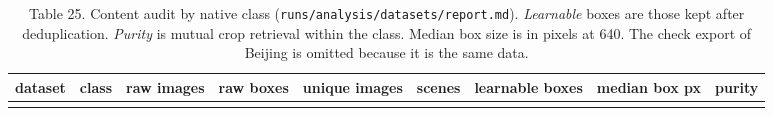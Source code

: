 \documentclass[
  10pt,
]{article}
\begin{document}
\begin{longtable}[]{@{}
  >{\raggedright\arraybackslash}p{}
  >{\raggedright\arraybackslash}p{}
  >{\raggedright\arraybackslash}p{}
  >{\raggedright\arraybackslash}p{}
  >{\raggedright\arraybackslash}p{}
  >{\raggedright\arraybackslash}p{}
  >{\raggedright\arraybackslash}p{}
  >{\raggedright\arraybackslash}p{}
  >{\raggedright\arraybackslash}p{}@{}}
\caption{Table 25. Content audit by native class
(\texttt{runs/analysis/datasets/report.md}). \emph{Learnable} boxes are
those kept after deduplication. \emph{Purity} is mutual crop retrieval
within the class. Median box size is in pixels at 640. The check export
of Beijing is omitted because it is the same data.}\tabularnewline
\toprule\noalign{}
\begin{minipage}[b]{\linewidth}\raggedright
dataset
\end{minipage} & \begin{minipage}[b]{\linewidth}\raggedright
class
\end{minipage} & \begin{minipage}[b]{\linewidth}\raggedright
raw images
\end{minipage} & \begin{minipage}[b]{\linewidth}\raggedright
raw boxes
\end{minipage} & \begin{minipage}[b]{\linewidth}\raggedright
unique images
\end{minipage} & \begin{minipage}[b]{\linewidth}\raggedright
scenes
\end{minipage} & \begin{minipage}[b]{\linewidth}\raggedright
learnable boxes
\end{minipage} & \begin{minipage}[b]{\linewidth}\raggedright
median box px
\end{minipage} & \begin{minipage}[b]{\linewidth}\raggedright
purity
\end{minipage} \\
\midrule\noalign{}
\endfirsthead
\toprule\noalign{}
\begin{minipage}[b]{\linewidth}\raggedright

\end{minipage}
\end{longtable}
\end{document}
